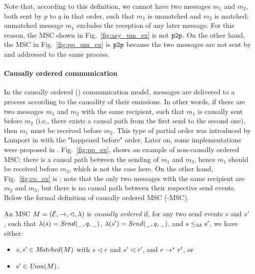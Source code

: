 Note that, according to this definition, we cannot have two messages $m_1$ and $m_2$, both sent by  $p$ to $q$ in that order, such that $m_1$ is unmatched and $m_2$ is matched;  unmatched message $m_1$ excludes the reception of any later message. For this reason, the MSC shown in Fig.~\ref{fig:asy_um_ex} is not $\mathtt{p2p}$. On the other hand, the MSC in Fig.~\ref{fig:pp_um_ex} is $\mathtt{p2p}$ because the two messages are not sent by and addressed to the same process.

\paragraph{\bf  Causally ordered communication}
In the causally ordered (\co) communication model, messages are delivered to a process according to the causality of their emissions. In other words, if there are two messages $m_1$ and $m_2$ with the same recipient, such that $m_1$ is causally sent before $m_2$ (i.e., there exists a causal path from the first send to the second one), then $m_1$ must be received before $m_2$.
This type of partial order was introduced by Lamport in \cite{Lamport78} with the "happened before" order. Later on, some implementations were proposed in \cite{peterson1989preserving, DBLP:conf/wdag/SchiperES89, kshemkalyani1998necessary}. %
Fig.~\ref{fig:pp_ex}, shows an example of non-causally ordered MSC; there is a causal path between the sending of $m_1$ and $m_3$, hence $m_1$ should be received before $m_3$, which is not the case here. On the other hand, Fig.~\ref{fig:co_ex} is \co; note that the only two messages with the same recipient are $m_2$ and $m_3$, but there is no causal path between their respective send events. Below the formal definition of causally ordered MSC (\co-MSC).

\begin{definition}[\co-MSC]\label{def:co_msc}
	An MSC $M = (\mathcal{E},\to,\lhd,\lambda)$ is \emph{causally ordered} if, for any two send events $s$ and $s'$, such that $\lambda(s)={\mathit{Send}(\hspace{0.1em}\underline{\hspace{0.5em}}\hspace{0.1em},q,\hspace{0.1em}\underline{\hspace{0.5em}}\hspace{0.1em})}$, $\lambda(s')={\mathit{Send}(\hspace{0.1em}\underline{\hspace{0.5em}}\hspace{0.1em},q,\hspace{0.1em}\underline{\hspace{0.5em}}\hspace{0.1em})}$, and $s \leq_{hb} s'$, we have either:
	\begin{itemize}%
		\item $s,s' \in \mathit{Matched}(M)$ with  $s \lhd r$ and $s' \lhd r'$, and $r \to^* r'$, or %
		\item $s' \in \mathit{Unm}(M)$.
	\end{itemize}
\end{definition}

